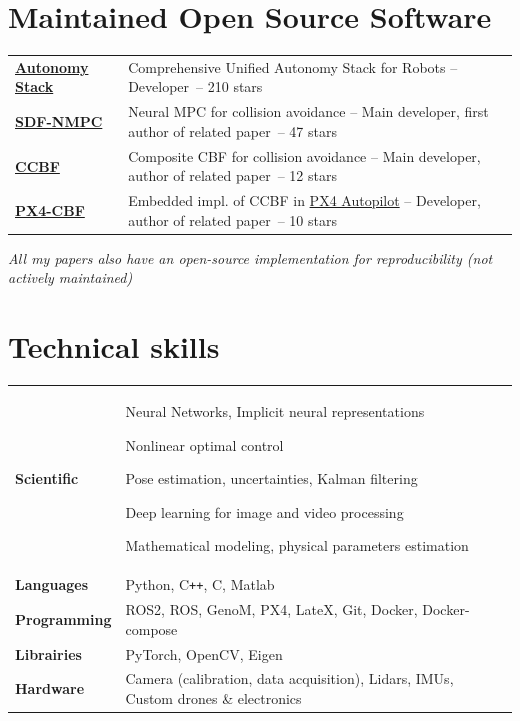 \documentclass[11pt,a4paper]{article}
\def\Plus{\texttt{+}}
\newlength{\colone}
\newlength{\coltwo}
\newcommand{\stars}[1]{\footnotesize{~-- #1 stars}}
\newcommand{\notes}[1]{{\small\color{gray}\itshape #1}}
\begin{document}
\section{Maintained Open Source Software}
\begin{longtable}{@{}p{\colone}p{\coltwo}@{}}
	{\bfseries \href{https://ntnu-arl.github.io/unified_autonomy_stack/}{Autonomy Stack}}
		& Comprehensive Unified Autonomy Stack for Robots -- {\small Developer}\stars{210}
\\
	{\bfseries \href{https://ntnu-arl.github.io/sdf-nmpc/}{SDF-NMPC}}
		& Neural MPC for collision avoidance -- {\small Main developer, first author of related paper}\stars{47}
\\
	{\bfseries \href{https://github.com/ntnu-arl/composite_cbf}{CCBF}}
		& Composite CBF for collision avoidance -- {\small Main developer, author of related paper}\stars{12}
\\
	{\bfseries \href{https://github.com/ntnu-arl/PX4-CBF}{PX4-CBF}}
		& Embedded impl. of CCBF in \href{https://px4.io/}{PX4 Autopilot} -- {\small Developer, author of related paper}\stars{10}
\end{longtable}

\notes{
	All my papers also have an open-source implementation for reproducibility (not actively maintained)
}

\section{Technical skills}
\begin{longtable}{@{}p{\colone}p{\coltwo}@{}}
	\bfseries Scientific
		& Neural Networks, Implicit neural representations \par
		Nonlinear optimal control \par
		Pose estimation, uncertainties, Kalman filtering \par
		Deep learning for image and video processing \par
		Mathematical modeling, physical parameters estimation \\
	\bfseries Languages
		& Python, {C\Plus\Plus}, C, Matlab \\
	\bfseries Programming
		& ROS2, ROS, GenoM, PX4, LateX, Git, Docker, Docker-compose \\
	\bfseries Librairies
		& PyTorch, OpenCV, Eigen \\
	\bfseries Hardware
		& Camera (calibration, data acquisition), Lidars, IMUs, Custom drones \& electronics
\end{longtable}
\end{document}
